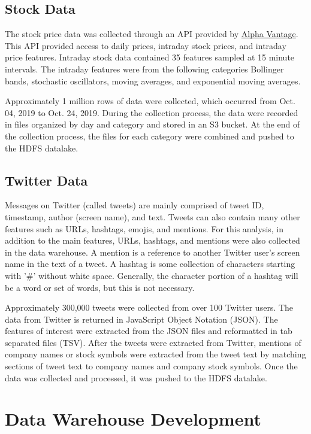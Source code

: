 \documentclass[journal]{IEEEtran}
\begin{document}
\subsection{Stock Data}

The stock price data was collected through an API provided by
 \href{https://www.alphavantage.co/}{Alpha Vantage}.
This API provided access to daily prices, intraday stock prices,
 and intraday price features.
Intraday stock data contained 35 features sampled at 15 minute intervals. 
The intraday features were from the following categories Bollinger bands, 
 stochastic oscillators, moving averages, and exponential moving averages.

Approximately 1 million rows of data were collected,
 which occurred from Oct. 04, 2019 to Oct. 24, 2019.
During the collection process, the data were recorded in files
 organized by day and category and stored in an S3 bucket.
At the end of the collection process, the files for each
 category were combined and pushed to the HDFS datalake.

\subsection{Twitter Data}

Messages on Twitter (called tweets) are mainly comprised of
 tweet ID, timestamp, author (screen name), and text.
Tweets can also contain many other features such as
 URLs, hashtags, emojis,  and mentions.
For this analysis, in addition to the main features,
 URLs, hashtags, and mentions were also collected in the data warehouse.
A mention is a reference to another Twitter user's screen name
 in the text of a tweet.
A hashtag is some collection of characters starting with
 '\#' without white space.
Generally, the character portion of a hashtag will be a word or set of words,
 but this is not necessary.

Approximately 300,000 tweets were collected from over 100 Twitter users.
The data from Twitter is returned in JavaScript Object Notation (JSON).
The features of interest were extracted from the JSON files and
 reformatted in tab separated files (TSV).
After the tweets were extracted from Twitter,
 mentions of company names or stock symbols were extracted from the tweet text by
 matching sections of tweet text to company names and company stock symbols.
Once the data was collected and processed, it was pushed to the HDFS datalake.


\section{Data Warehouse Development}
\end{document}
